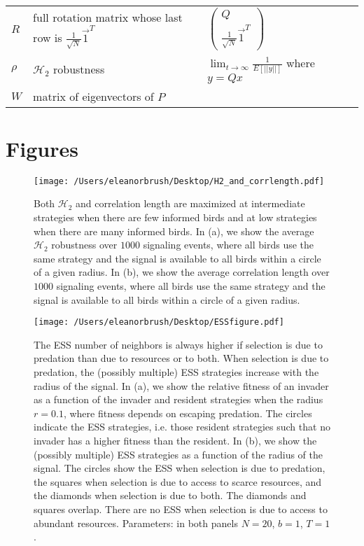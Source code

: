 \documentclass{article}
\begin{document}
\begin{table}
\begin{tabular}{@{}lllll@{}}
\\$R$ & full rotation matrix whose last row is $\frac{1}{\sqrt{N}}\vec{1}^T$ & $\left(\begin{array}{cc} Q \\ \frac{1}{\sqrt{N}}\vec{1}^T \end{array}\right)$
\\$\rho$ & $\mathscr{H}_2$ robustness & $\lim_{t\to\infty}\frac{1}{E[||y||]}$ where $y=Qx$
\\$W$ & matrix of eigenvectors of $P$
\end{tabular}
\end{table}

\newpage
\section{Figures }
\begin{figure}
\texttt{[image: /Users/eleanorbrush/Desktop/H2\_and\_corrlength.pdf]}
\caption{\label{compare_props}  Both $\mathscr{H}_2$ and correlation length are maximized at intermediate strategies when there are few informed birds and at low strategies when there are many informed birds. In (a), we show the average $\mathscr{H}_2$ robustness over $1000$ signaling events, where all birds use the same strategy and the signal is available to all birds within a circle of a given radius.  In (b), we show the average correlation length over $1000$ signaling events, where all birds use the same strategy and the signal is available to all birds within a circle of a given radius. }
\end{figure}

\begin{figure}
\texttt{[image: /Users/eleanorbrush/Desktop/ESSfigure.pdf]}
\caption{\label{ESS} The ESS number of neighbors is always higher if selection is due to predation than due to resources or to both. When selection is due to predation, the (possibly multiple) ESS strategies increase with the radius of the signal. In (a), we show the relative fitness of an invader as a function of the invader and resident strategies when the radius $r=0.1$, where fitness depends on escaping predation. The circles indicate the ESS strategies, i.e. those resident strategies such that no invader has a higher fitness than the resident. In (b), we show the (possibly multiple) ESS strategies as a function of the radius of the signal. The circles show the ESS when selection is due to predation, the squares when selection is due to access to scarce resources, and the diamonds when selection is due to both. The diamonds and squares overlap. There are no ESS when selection is due to access to abundant resources.  Parameters:  in both panels $N=20$, $b=1$, $T=1$. 
}
\end{figure}
\end{document}
